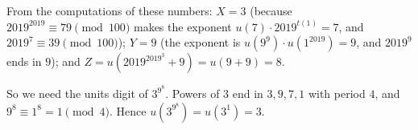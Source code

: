 From the computations of these numbers: $X=3$ (because $2019^{2019}\equiv79\pmod{100}$ makes the exponent $u(7)\cdot2019^{t(1)}=7$, and $2019^7\equiv39\pmod{100}$); $Y=9$ (the exponent is $u(9^9)\cdot u(1^{2019})=9$, and $2019^9$ ends in $9$); and $Z=u\left(2019^{2019^3}+9\right)=u(9+9)=8$.

So we need the units digit of $3^{9^8}$. Powers of $3$ end in $3,9,7,1$ with period $4$, and $9^8\equiv1^8=1\pmod4$. Hence $u\left(3^{9^8}\right)=u(3^1)=\boxed{3}$.
